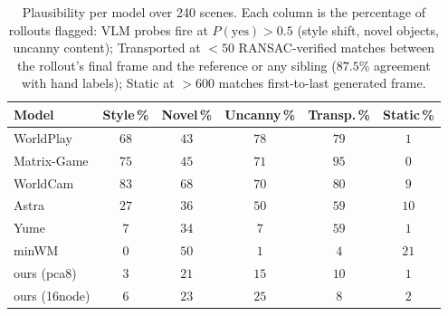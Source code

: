 \begin{table}[t]
\centering
\small
\setlength{\tabcolsep}{4pt}
\caption{Plausibility per model over 240 scenes. Each column is the percentage of rollouts flagged: VLM probes fire at $P(\text{yes})>0.5$ (style shift, novel objects, uncanny content); Transported at $<50$ RANSAC-verified matches between the rollout's final frame and the reference or any sibling ($87.5\%$ agreement with hand labels); Static at $>600$ matches first-to-last generated frame.}
\label{tab:plaus-baselines}
\begin{tabular}{lccccc}
\hline
Model & Style\,\% & Novel\,\% & Uncanny\,\% & Transp.\,\% & Static\,\% \\
\hline
WorldPlay   & $68$ & $43$ & $78$ & $79$ & $1$  \\
Matrix-Game & $75$ & $45$ & $71$ & $95$ & $0$  \\
WorldCam    & $83$ & $68$ & $70$ & $80$ & $9$  \\
Astra       & $27$ & $36$ & $50$ & $59$ & $10$ \\
Yume        & $7$  & $34$ & $7$  & $59$ & $1$  \\
minWM       & $0$  & $50$ & $1$  & $4$  & $21$ \\
\hline
ours (pca8)   & $3$ & $21$ & $15$ & $10$ & $1$ \\
ours (16node) & $6$ & $23$ & $25$ & $8$  & $2$ \\
\hline
\end{tabular}
\end{table}
